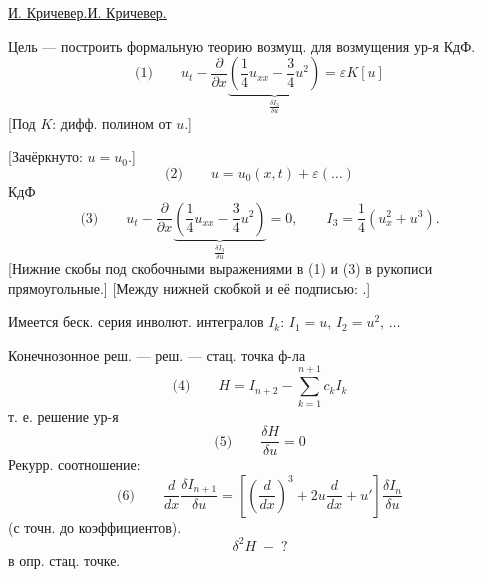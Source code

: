 \documentclass[11pt]{article}
\theoremstyle{definition}
\theoremstyle{remark}
\newcommand{\Unclear}[3]{%
  \begingroup\color{orange!70!black}%
  [Unresolved reading #1/#2: #3]\endgroup%
}
\renewcommand{\Unclear}[3]{%
  \begingroup\color{orange!65!black}%
  \ifmmode\text{[неясно: #3]}\else[неясно: #3]\fi\endgroup%
}
\let\DiplomaticMathUnderline\underline
\renewcommand{\underline}[1]{\ifmmode\DiplomaticMathUnderline{#1}\else\uline{#1}\fi}
\begin{document}
\underline{И. Кричевер.}

Цель --- построить формальную теорию возмущ. для возмущения ур-я КдФ.
\begin{equation*}
\text{(1)}\qquad
u_t-\frac{\partial}{\partial x}
\underbrace{\left(\frac{1}{4}u_{xx}-\frac{3}{4}u^2\right)}_{\frac{\delta I_3}{\delta u}}
=\varepsilon K[u]
\end{equation*}
[Под $K$: дифф. полином от $u$.]

[Зачёркнуто: $u=u_0$.]
\begin{equation*}
\text{(2)}\qquad u=u_0(x,t)+\varepsilon(\ldots)
\end{equation*}
КдФ
\begin{equation*}
\text{(3)}\qquad
u_t-\frac{\partial}{\partial x}
\underbrace{\left(\frac{1}{4}u_{xx}-\frac{3}{4}u^2\right)}_{\frac{\delta I_3}{\delta u}}
=0,\qquad I_3=\frac{1}{4}(u_x^2+u^3).
\end{equation*}
[Нижние скобы под скобочными выражениями в (1) и (3) в рукописи прямоугольные.]
[Между нижней скобкой и её подписью: \Unclear{GELFAND-P001087}{eq03-variational-annotation}{$\Vert$}.]

Имеется беск. серия инволют. интегралов $I_k$: $I_1=u$, $I_2=u^2$, $\ldots$

Конечнозонное реш. --- реш. --- стац. точка ф-ла
\begin{equation*}
\text{(4)}\qquad H=I_{n+2}-\sum_{k=1}^{n+1}c_k I_k
\end{equation*}
т. е. решение ур-я
\begin{equation*}
\text{(5)}\qquad \frac{\delta H}{\delta u}=0
\end{equation*}
Рекурр. соотношение:
\begin{equation*}
\text{(6)}\qquad
\frac{d}{dx}\frac{\delta I_{n+1}}{\delta u}
=\left[\left(\frac{d}{dx}\right)^3+2u\frac{d}{dx}+u'\right]
\frac{\delta I_n}{\delta u}
\end{equation*}
(с точн. до коэффициентов).
\begin{equation*}
\delta^2 H\; -\; ?
\end{equation*}
в опр. стац. точке.
\end{document}
